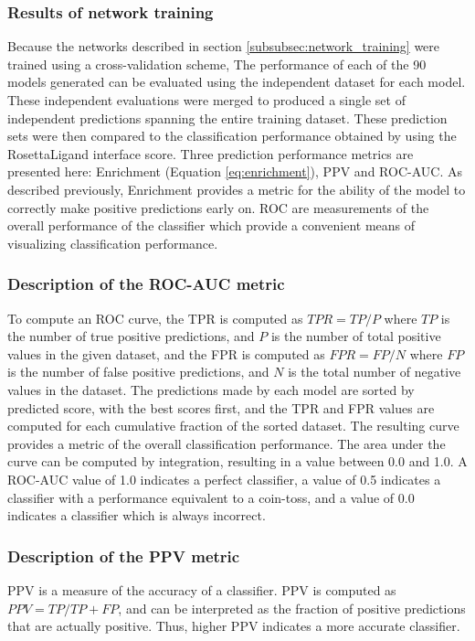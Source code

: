 \subsubsection{Results of network training}

Because the networks described in section \ref{subsubsec:network_training} were trained using a cross-validation scheme, The performance of each of the 90 models generated can be evaluated using the independent dataset for each model.
These independent evaluations were merged to produced a single set of independent predictions spanning the entire training dataset.
These prediction sets were then compared to the classification performance obtained by using the RosettaLigand interface score.
Three prediction performance metrics are presented here: Enrichment (Equation \ref{eq:enrichment}), \ac{PPV} and \ac{ROC-AUC}. 
As described previously, Enrichment provides a metric for the ability of the model to correctly make positive predictions early on.
\ac{ROC} are measurements of the overall performance of the classifier which provide a convenient means of visualizing classification performance. 

\subsubsection{Description of the \acs{ROC-AUC} metric}
To compute an \ac{ROC} curve, the \ac{TPR} is computed as $TPR=TP/P$ where $TP$ is the number of true positive predictions, and $P$ is the number of total positive values in the given dataset, and the \ac{FPR} is computed as $FPR=FP/N$ where $FP$ is the number of false positive predictions, and $N$ is the total number of negative values in the dataset.
The predictions made by each model are sorted by predicted score, with the best scores first, and the \ac{TPR} and \ac{FPR} values are computed for each cumulative fraction of the sorted dataset.
The resulting curve provides a metric of the overall classification performance.
The area under the curve can be computed by integration, resulting in a value between 0.0 and 1.0.
A \ac{ROC-AUC} value of 1.0 indicates a perfect classifier, a value of 0.5 indicates a classifier with a performance equivalent to a coin-toss, and a value of 0.0 indicates a classifier which is always incorrect.

\subsubsection{Description of the \acs{PPV} metric}
\ac{PPV} is a measure of the accuracy of a classifier.  
\ac{PPV} is computed as $PPV=TP/TP+FP$, and can be interpreted as the fraction of positive predictions that are actually positive.
Thus, higher \ac{PPV} indicates a more accurate classifier.

